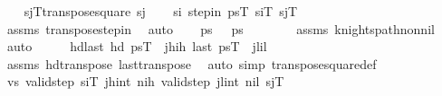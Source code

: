 \begin{isabellebody}
\ \ \isamarkupfalse%
\ {\isacharquery}{\kern0pt}s\isactrlsub jT{\isacharequal}{\kern0pt}{\isachardoublequoteopen}transpose{\isacharunderscore}{\kern0pt}square\ s\isactrlsub j{\isachardoublequoteclose}\isanewline
\ \ \isamarkupfalse%
\ si{\isacharcolon}{\kern0pt}\ {\isachardoublequoteopen}step{\isacharunderscore}{\kern0pt}in\ {\isacharquery}{\kern0pt}psT\ {\isacharquery}{\kern0pt}s\isactrlsub iT\ {\isacharquery}{\kern0pt}s\isactrlsub jT{\isachardoublequoteclose}\isanewline
\ \ \ \ \isamarkupfalse%
\ assms\ transpose{\isacharunderscore}{\kern0pt}step{\isacharunderscore}{\kern0pt}in\ \isamarkupfalse%
\ auto\isanewline
\isanewline
\ \ \isamarkupfalse%
\ {\isachardoublequoteopen}ps\ {\isasymnoteq}\ {\isacharbrackleft}{\kern0pt}{\isacharbrackright}{\kern0pt}{\isachardoublequoteclose}\ {\isachardoublequoteopen}ps\ {\isasymnoteq}\ {\isacharbrackleft}{\kern0pt}{\isacharbrackright}{\kern0pt}{\isachardoublequoteclose}\isanewline
\ \ \ \ \isamarkupfalse%
\ assms\ knights{\isacharunderscore}{\kern0pt}path{\isacharunderscore}{\kern0pt}non{\isacharunderscore}{\kern0pt}nil\ \isamarkupfalse%
\ auto\isanewline
\ \ \isamarkupfalse%
\ \isamarkupfalse%
\ hd{\isacharunderscore}{\kern0pt}last{}{\isacharcolon}{\kern0pt}\ {\isachardoublequoteopen}hd\ {\isacharquery}{\kern0pt}psT\ {\isacharequal}{\kern0pt}\ {\isacharparenleft}{\kern0pt}j\isactrlsub h{\isacharcomma}{\kern0pt}i\isactrlsub h{\isacharparenright}{\kern0pt}{\isachardoublequoteclose}\ {\isachardoublequoteopen}last\ {\isacharquery}{\kern0pt}psT\ {\isacharequal}{\kern0pt}\ {\isacharparenleft}{\kern0pt}j\isactrlsub l{\isacharcomma}{\kern0pt}i\isactrlsub l{\isacharparenright}{\kern0pt}{\isachardoublequoteclose}\isanewline
\ \ \ \ \isamarkupfalse%
\ assms\ hd{\isacharunderscore}{\kern0pt}transpose\ last{\isacharunderscore}{\kern0pt}transpose\ \isamarkupfalse%
\ {\isacharparenleft}{\kern0pt}auto\ simp{\isacharcolon}{\kern0pt}\ transpose{\isacharunderscore}{\kern0pt}square{\isacharunderscore}{\kern0pt}def{\isacharparenright}{\kern0pt}\isanewline
\isanewline
\ \ \isamarkupfalse%
\ vs{\isacharcolon}{\kern0pt}\ {\isachardoublequoteopen}valid{\isacharunderscore}{\kern0pt}step\ {\isacharquery}{\kern0pt}s\isactrlsub iT\ {\isacharparenleft}{\kern0pt}j\isactrlsub h{\isacharcomma}{\kern0pt}int\ ni\isactrlsub h{\isacharparenright}{\kern0pt}{\isachardoublequoteclose}\ {\isachardoublequoteopen}valid{\isacharunderscore}{\kern0pt}step\ {\isacharparenleft}{\kern0pt}j\isactrlsub l{\isacharcomma}{\kern0pt}int\ ni\isactrlsub l{\isacharparenright}{\kern0pt}\ {\isacharquery}{\kern0pt}s\isactrlsub jT{\isachardoublequoteclose}\isanewline

\end{isabellebody}
